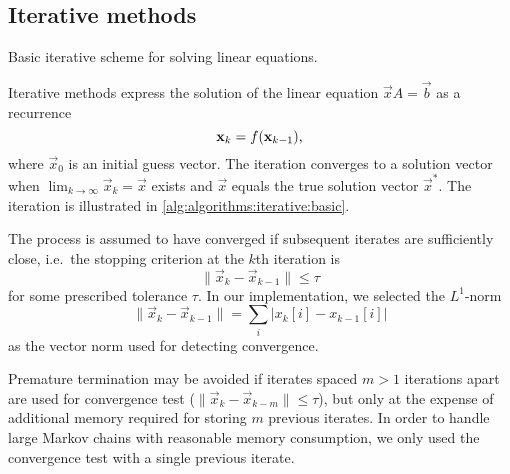 \subsection{Iterative methods}

\begin{algorithm}
  \;
  \caption{Basic iterative scheme for solving linear equations.}
  \label{alg:algorithms:iterative:basic}
\end{algorithm}

Iterative methods express the solution of the linear equation $\vec{x}
A = \vec{b}$ as a recurrence
\begin{equation}
  \vec{x}_{k} = f(\vec{x}_{k - 1}) \text,
\end{equation}
where $\vec{x}_0$ is an initial guess vector. The iteration converges
to a solution vector when $\lim_{k \to \infty} \vec{x}_k = \vec{x}$
exists and $\vec{x}$ equals the true solution vector $\vec{x}^*$. The
iteration is illustrated in \vref{alg:algorithms:iterative:basic}.

The process is assumed to have converged if subsequent iterates are
sufficiently close, i.e.~the stopping criterion at the $k$th iteration
is
\begin{equation}
  \label{eq:algorithms:iterative:convergence}
  \| \vec{x}_{k} - \vec{x}_{k - 1} \| \le \tau
\end{equation}
for some prescribed tolerance $\tau$. In our implementation, we
selected the $L^1$-norm
\begin{equation}
  \| \vec{x}_{k} - \vec{x}_{k - 1} \| = \sum_{i} \bigl\lvert x_{k}[i] - x_{k -
    1}[i] \bigr\rvert
\end{equation}
as the vector norm used for detecting convergence.

Premature termination may be avoided if iterates spaced $m > 1$
iterations apart are used for convergence test
($\| \vec{x}_k - \vec{x}_{k - m} \| \le \tau$), but only at the
expense of additional memory required for storing $m$ previous
iterates. In order to handle large Markov chains with reasonable
memory consumption, we only used the convergence test with a single
previous iterate.

